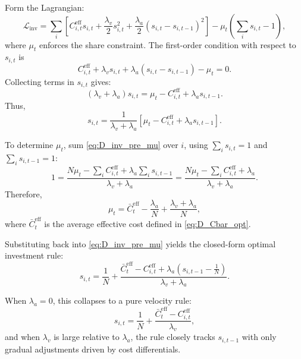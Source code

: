\documentclass[preprint,authoryear,12pt]{elsarticle}
\begin{document}
Form the Lagrangian:
\begin{equation}
    \mathcal{L}_{\mathrm{inv}}
    = \sum_i \left[
        C_{i,t}^{\mathrm{eff}} s_{i,t}
      + \frac{\lambda_v}{2} s_{i,t}^2
      + \frac{\lambda_a}{2} (s_{i,t} - s_{i,t-1})^2
    \right]
    - \mu_t \left( \sum_i s_{i,t} - 1 \right),
\end{equation}
where $\mu_t$ enforces the share constraint. The first-order condition with respect to $s_{i,t}$
is
\begin{equation}
    C_{i,t}^{\mathrm{eff}}
    + \lambda_v s_{i,t}
    + \lambda_a (s_{i,t} - s_{i,t-1})
    - \mu_t = 0.
    \label{eq:D_inv_FOC}
\end{equation}
Collecting terms in $s_{i,t}$ gives:
\begin{equation}
    (\lambda_v + \lambda_a) s_{i,t}
    = \mu_t
      - C_{i,t}^{\mathrm{eff}}
      + \lambda_a s_{i,t-1}.
    \label{eq:D_inv_linear}
\end{equation}
Thus,
\begin{equation}
    s_{i,t}
    = \frac{1}{\lambda_v + \lambda_a}
      \left[
          \mu_t
        - C_{i,t}^{\mathrm{eff}}
        + \lambda_a s_{i,t-1}
      \right].
    \label{eq:D_inv_pre_mu}
\end{equation}

To determine $\mu_t$, sum \eqref{eq:D_inv_pre_mu} over $i$, using $\sum_i s_{i,t} = 1$ and
$\sum_i s_{i,t-1} = 1$:
\[
    1
    = \frac{N\mu_t
        - \sum_i C_{i,t}^{\mathrm{eff}}
        + \lambda_a \sum_i s_{i,t-1}
      }{\lambda_v + \lambda_a}
    = \frac{N\mu_t
        - \sum_i C_{i,t}^{\mathrm{eff}}
        + \lambda_a
      }{\lambda_v + \lambda_a}.
\]
Therefore,
\begin{equation}
    \mu_t
    = \bar{C}_t^{\mathrm{eff}}
      - \frac{\lambda_a}{N}
      + \frac{\lambda_v + \lambda_a}{N},
\end{equation}
where $\bar{C}_t^{\mathrm{eff}}$ is the average effective cost defined in \eqref{eq:D_Cbar_opt}.

Substituting back into \eqref{eq:D_inv_pre_mu} yields the closed-form optimal investment rule:
\begin{equation}
    s_{i,t}
    = \frac{1}{N}
      + \frac{
            \bar{C}_t^{\mathrm{eff}}
          - C_{i,t}^{\mathrm{eff}}
          + \lambda_a (s_{i,t-1} - \tfrac{1}{N})
        }{\lambda_v + \lambda_a}.
    \label{eq:D_inv_rule_final}
\end{equation}

When $\lambda_a = 0$, this collapses to a pure velocity rule:
\[
    s_{i,t}
    = \frac{1}{N}
      + \frac{\bar{C}_t^{\mathrm{eff}} - C_{i,t}^{\mathrm{eff}}}{\lambda_v},
\]
and when $\lambda_v$ is large relative to $\lambda_a$, the rule closely tracks $s_{i,t-1}$ with only
gradual adjustments driven by cost differentials.
\end{document}
